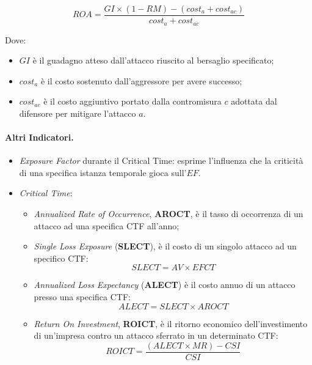 \[
    ROA = \frac{GI \times (1 - RM) - (cost_a + cost_{ac})}{cost_a + cost_{ac}}
\]

Dove:

\begin{itemize}
    \item \(GI\) è il guadagno atteso dall'attacco riuscito al bersaglio
          specificato;
    \item \(cost_{a}\) è il costo sostenuto dall'aggressore per avere successo;
    \item \(cost_{ac}\) è il costo aggiuntivo portato dalla contromisura \(c\)
          adottata dal difensore per mitigare
          l'attacco \(a\).
\end{itemize}

\paragraph{Altri Indicatori.}

\begin{itemize}
    \item \textit{Exposure Factor} durante il Critical Time:
          esprime l'influenza che la criticità di una specifica
          istanza temporale gioca sull'\(EF\).
    \item \textit{Critical Time}:
          \begin{itemize}
              \item \textit{Annualized Rate of Occurrence}, \textbf{AROCT},
                    è il tasso di occorrenza di un attacco ad
                    una specifica CTF all'anno;
              \item \textit{Single Loss Exposure} (\textbf{SLECT}), è il costo
                    di un singolo attacco ad un specifico CTF:
                    \[
                        SLECT = AV \times EFCT
                    \]
              \item \textit{Annualized Loss Expectancy} (\textbf{ALECT}) è il
                    costo annuo di un attacco presso una
                    specifica CTF:
                    \[
                        ALECT = SLECT \times AROCT
                    \]
              \item \textit{Return On Investment}, \textbf{ROICT}, è il ritorno
                    economico dell'investimento di
                    un'impresa contro un attacco sferrato in un determinato CTF:
                    \[
                        ROICT = \frac{(ALECT \times MR) - CSI}{CSI}
                    \]
          \end{itemize}
\end{itemize}